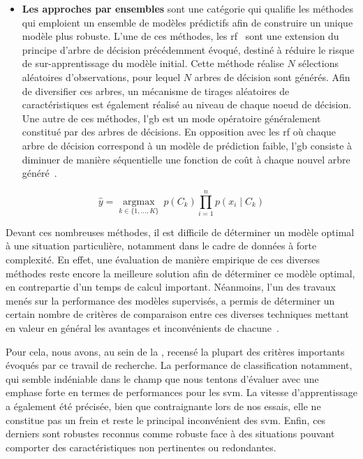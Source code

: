 \begin{itemize}
    \item \textbf{Les approches par ensembles} sont une catégorie qui qualifie les méthodes qui emploient un ensemble de modèles prédictifs afin de construire un unique modèle plus robuste. L'une de ces méthodes, les \gls{rf}~\cite{Breiman2001} sont une extension du principe d'arbre de décision précédemment évoqué, destiné à réduire le risque de sur-apprentissage du modèle initial. Cette méthode réalise $N$ sélections aléatoires d'observations, pour lequel $N$ arbres de décision sont générés. Afin de diversifier ces arbres, un mécanisme de tirages aléatoires de caractéristiques est également réalisé au niveau de chaque noeud de décision. Une autre de ces méthodes, l'\gls{gb} est un mode opératoire généralement constitué par des arbres de décisions. En opposition avec les \gls{rf} où chaque arbre de décision correspond à un modèle de prédiction faible, l'\gls{gb} consiste à diminuer de manière séquentielle une fonction de coût à chaque nouvel arbre généré~\cite{Friedman2001}.
\end{itemize}\par

\begin{equation} 
    \label{eq:bayesian}
    \hat{y} = \underset{k \in \{1, \ldots, K\}}{\operatorname{argmax}} \ p(C_k) \displaystyle\prod_{i=1}^n p(x_i \mid C_k)
\end{equation}

Devant ces nombreuses méthodes, il est difficile de déterminer un modèle optimal à une situation particulière, notamment dans le cadre de données à forte complexité. En effet, une évaluation de manière empirique de ces diverses méthodes reste encore la meilleure solution afin de déterminer ce modèle optimal, en contrepartie d'un temps de calcul important. Néanmoins, l'un des travaux menés sur la performance des modèles supervisés, a permis de déterminer un certain nombre de critères de comparaison entre ces diverses techniques mettant en valeur en général les avantages et inconvénients de chacune~\cite{Kotsiantis2007}.\par

Pour cela, nous avons, au sein de la , recensé la plupart des critères importants évoqués par ce travail de recherche. La performance de classification notamment, qui semble indéniable dans le champ que nous tentons d'évaluer avec une emphase forte en termes de performances pour les \gls{svm}. La vitesse d'apprentissage a également été précisée, bien que contraignante lors de nos essais, elle ne constitue pas un frein et reste le principal inconvénient des \gls{svm}. Enfin, ces derniers sont robustes reconnus comme robuste face à des situations pouvant comporter des caractéristiques non pertinentes ou redondantes.\par

